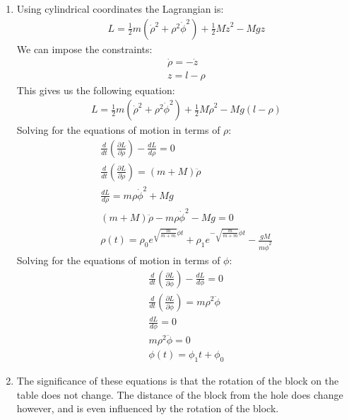 \documentclass[12pt]{article}
\newcommand{\p}[2]{\frac{\partial #1}{\partial #2}}
\newcommand{\der}[2]{\frac{d #1}{d #2}}
\begin{document}
\begin{enumerate}
        \begin{enumerate}
            \item
            Using cylindrical coordinates the Lagrangian is:
            \begin{gather*}
                L=\frac{1}{2}m\left(\dot{\rho}^2+\rho^2\dot{\phi}^2\right)+\frac{1}{2}M\dot{z}^2-Mgz
            \end{gather*}
            We can impose the constraints:
            \begin{gather*}
                \dot{\rho}=-\dot{z}\\
                z=l-\rho
            \end{gather*}
            This gives us the following equation:
            \begin{gather*}
                L=\frac{1}{2}m\left(\dot{\rho}^2+\rho^2\dot{\phi}^2\right)+\frac{1}{2}M\dot{\rho}^2-Mg(l-\rho)
            \end{gather*}
            Solving for the equations of motion in terms of $\rho$:
            \begin{gather*}
                \frac{d}{dt}\left(\p{L}{\dot{\rho}}\right)-\der{L}{\rho}=0\\
                \frac{d}{dt}\left(\p{L}{\dot{\rho}}\right)=(m+M)\ddot{\rho}\\
                \der{L}{\rho}=m\rho\dot{\phi}^2+Mg\\
                (m+M)\ddot{\rho}-m\rho\dot{\phi}^2-Mg=0\\
                \rho(t)=\rho_0 e^{\sqrt{\frac{m}{m+m}}\dot{\phi} t}+\rho_1 e^{-\sqrt{\frac{m}{m+m}}\dot{\phi} t}-\frac{gM}{m\dot{\phi}^2}
            \end{gather*}
            Solving for the equations of motion in terms of $\phi$:
            \begin{gather*}
                \frac{d}{dt}\left(\p{L}{\dot{\phi}}\right)-\der{L}{\phi}=0\\
                \frac{d}{dt}\left(\p{L}{\dot{\phi}}\right)=m\rho^2\ddot{\phi}\\
                \der{L}{\phi}=0\\
                m\rho^2\ddot{\phi}=0\\
                \phi(t)=\phi_1 t+\phi_0
            \end{gather*}
            \item
            The significance of these equations is that the rotation of the block on the table does not change.
            The distance of the block from the hole does change however, and is even influenced by the rotation of the block.

\end{enumerate}
\end{enumerate}
\end{document}

